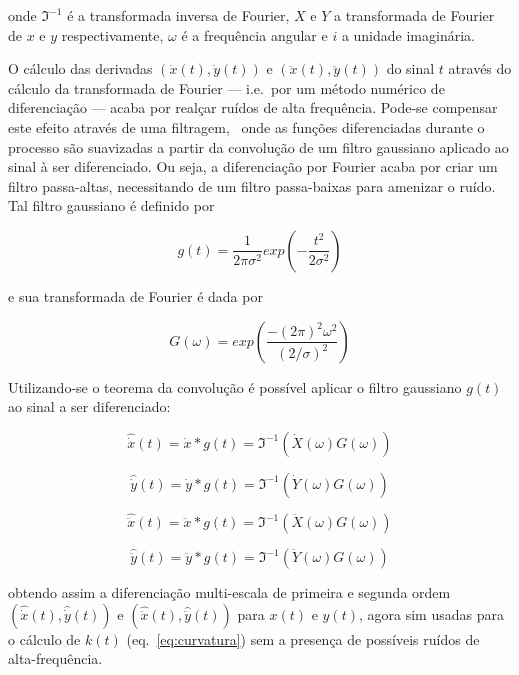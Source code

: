 \noindent onde $\Im^{-1}$ é a transformada inversa de Fourier, $X$ e $Y$ a
transformada de Fourier de $x$ e $y$ respectivamente, $\omega$ é a frequência angular
e $i$ a unidade imaginária.

O cálculo das derivadas $(\dot{x}(t), \dot{y}(t))$ e $(\ddot{x}(t),
\ddot{y}(t))$ do sinal $t$ através do cálculo da transformada de
Fourier --- i.e.\ por um método numérico de diferenciação --- acaba
por realçar ruídos de alta frequência. Pode-se compensar este efeito
através de uma filtragem,~\cite{luciano,luciano2010} onde as funções
diferenciadas durante o processo são suavizadas a partir da convolução
de um filtro gaussiano aplicado ao sinal à ser diferenciado. Ou seja,
a diferenciação por Fourier acaba por criar um filtro passa-altas,
necessitando de um filtro passa-baixas para amenizar o ruído. Tal
filtro gaussiano é definido por

\begin{equation}
g(t) = \frac{1}{2\pi\sigma^2} exp \left( -\frac{t^2}{2\sigma^2}\right)
\end{equation}

\noindent e sua transformada de Fourier é dada por

\begin{equation}
G(\omega) = exp \left( \frac{-(2\pi)^2\omega^2}{(2/\sigma)^2} \right)
\end{equation}

Utilizando-se o teorema da convolução é possível aplicar o filtro
gaussiano $g(t)$ ao sinal a ser diferenciado:

\begin{equation}
\hat{\dot{x}}(t) = \dot{x} \ast g(t) = \Im^{-1}\left( \dot{X}(\omega) G(\omega) \right)
\end{equation}

\begin{equation}
\hat{\dot{y}}(t) = \dot{y} \ast g(t) = \Im^{-1}\left( \dot{Y}(\omega) G(\omega) \right)
\end{equation}

\begin{equation}
\hat{\ddot{x}}(t) = \ddot{x} \ast g(t) = \Im^{-1}\left( \ddot{X}(\omega) G(\omega) \right)
\end{equation}

\begin{equation}
\hat{\ddot{y}}(t) = \ddot{y} \ast g(t) = \Im^{-1}\left( \ddot{Y}(\omega) G(\omega) \right)
\end{equation}

\noindent obtendo assim a diferenciação multi-escala de primeira e
segunda ordem $(\hat{\dot{x}}(t),\hat{\dot{y}}(t))$ e
$(\hat{\ddot{x}}(t),\hat{\ddot{y}}(t))$ para $x(t)$ e $y(t)$, agora
sim usadas para o cálculo de $k(t)$ (eq.~\ref{eq:curvatura}) sem a
presença de possíveis ruídos de alta-frequência.

